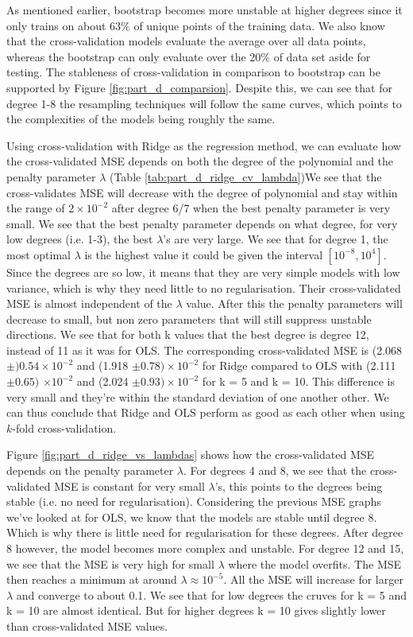 \documentclass[reprint,english,notitlepage]{revtex4-2}  %
\begin{document}
As mentioned earlier, bootstrap becomes more unstable at higher degrees since it only trains on about 63$\%$ of unique points of the training data.  We also know that the cross-validation models evaluate the average over all data points, whereas the bootstrap can only evaluate over the 20$\%$ of data set aside for testing. The stableness of cross-validation in comparison to bootstrap can be supported by Figure \ref{fig:part_d_comparsion}. Despite this, we can see that for degree 1-8 the resampling techniques will follow the same curves, which points to the complexities of the models being roughly the same.

Using cross-validation with Ridge as the regression method, we can evaluate how the cross-validated MSE depends on both the degree of the polynomial and the penalty parameter $\lambda$ (Table \ref{tab:part_d_ridge_cv_lambda})We see that the cross-validates MSE will decrease with the degree of polynomial and stay within the range of $2 \times 10^{-2}$ after degree 6/7 when the best penalty parameter is very small. We see that the best penalty parameter depends on what degree, for very low degrees (i.e. 1-3), the best $\lambda$'s are very large. We see that for degree 1, the most optimal $\lambda$ is the highest value it could be given the interval $[10^{-8}, 10^4]$. Since the degrees are so low, it means that they are very simple models with low variance, which is why they need little to no regularisation. Their cross-validated MSE is almost independent of the $\lambda$ value. After this the penalty parameters will decrease to small, but non zero parameters that will still suppress unstable directions. We see that for both k values that the best degree is degree 12, instead of 11 as it was for OLS. The corresponding cross-validated MSE is (2.068 $ \pm) 0.54 \times 10^{-2}$ and (1.918 $\pm 0.78) \times 10^{-2}$ for Ridge compared to OLS with (2.111 $\pm 0.65)$ $\times 10^{-2}$ and (2.024 $\pm 0.93) \times 10^{-2}$ for k = 5 and k = 10. This difference is very small and they're within the standard deviation of one another other. We can thus conclude that Ridge and OLS perform as good as each other when using $k$-fold cross-validation.

Figure \ref{fig:part_d_ridge_vs_lambdas} shows how the cross-validated MSE depends on the penalty parameter $\lambda$. For degrees 4 and 8, we see that the cross-validated MSE is constant for very small $\lambda$'s, this points to the degrees being stable (i.e. no need for regularisation). Considering the previous MSE graphs we've looked at for OLS, we know that the models are stable until degree 8. Which is why there is little need for regularisation for these degrees. After degree 8 however, the model becomes more complex and unstable. For degree 12 and 15, we see that the MSE is very high for small $\lambda$ where the model overfits. The MSE then reaches a minimum at around $\lambda \approx 10^{-5}$. All the MSE will increase for larger $\lambda$ and converge to about 0.1. We see that for low degrees the cruves for k = 5 and k = 10 are almost identical. But for higher degrees k = 10 gives slightly lower than cross-validated MSE values. 
\end{document}
